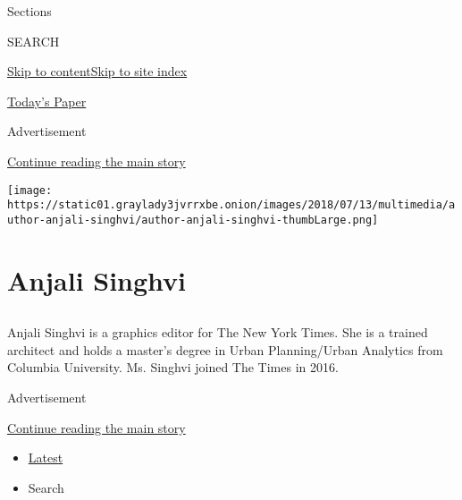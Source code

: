 Sections

SEARCH

\protect\hyperlink{site-content}{Skip to
content}\protect\hyperlink{site-index}{Skip to site index}

\href{https://myaccount.nytimes3xbfgragh.onion/auth/login?response_type=cookie\&client_id=vi}{}

\href{https://www.nytimes3xbfgragh.onion/section/todayspaper}{Today's
Paper}

Advertisement

\protect\hyperlink{after-top}{Continue reading the main story}

\texttt{[image: https://static01.graylady3jvrrxbe.onion/images/2018/07/13/multimedia/author-anjali-singhvi/author-anjali-singhvi-thumbLarge.png]}

\hypertarget{anjali-singhvi}{%
\section{Anjali Singhvi}\label{anjali-singhvi}}

\subsection{}

Anjali Singhvi is a graphics editor for The New York Times. She is a
trained architect and holds a master's degree in Urban Planning/Urban
Analytics from Columbia University. Ms. Singhvi joined The Times in
2016.

Advertisement

\protect\hyperlink{after-mid1}{Continue reading the main story}

\begin{itemize}
\tightlist
\item
  \protect\hyperlink{stream-panel}{Latest}
\item
  Search
\end{itemize}

